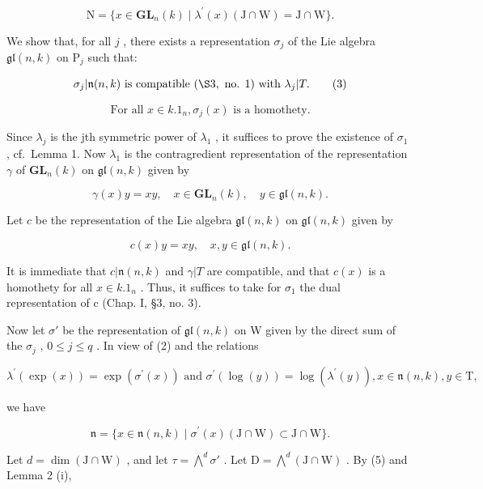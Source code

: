 \[
\mathrm{N} = \{x \in \mathbf {G L} _ {n} (k) \mid \lambda^ {\prime} (x) (\mathrm{J} \cap \mathrm{W}) = \mathrm{J} \cap \mathrm{W} \}.\tag{2}
\]

We show that, for all \(j\) , there exists a representation \(\sigma_{j}\) of the Lie algebra \(\mathfrak{gl}(n,k)\) on \(\mathrm{P}_j\) such that:

\[
\sigma_ {j} | \mathfrak {n} (n, k) \text {   is   compatible   } (\S 3, \text {   no.   } 1) \text {   with   } \lambda_ {j} | T.\tag{3}
\]

\[
\text { For   all } x \in k. 1 _ {n}, \sigma_ {j} (x) \text { is   a   homothety. }\tag{4}
\]

Since \(\lambda_{j}\) is the jth symmetric power of \(\lambda_{1}\) , it suffices to prove the existence of \(\sigma_{1}\) , cf.~Lemma 1. Now \(\lambda_{1}\) is the contragredient representation of the representation \(\gamma\) of \(\mathbf{GL}_{n}(k)\) on \(\mathfrak{gl}(n,k)\) given by

\[
\gamma (x) y = x y, \quad x \in \mathbf {G L} _ {n} (k), \quad y \in \mathfrak {g l} (n, k).
\]

Let \(c\) be the representation of the Lie algebra \(\mathfrak{gl}(n,k)\) on \(\mathfrak{gl}(n,k)\) given by

\[
c (x) y = x y, \quad x, y \in \mathfrak {g l} (n, k).
\]

It is immediate that \(c|\mathfrak{n}(n,k)\) and \(\gamma|T\) are compatible, and that \(c(x)\) is a homothety for all \(x \in k.1_{n}\) . Thus, it suffices to take for \(\sigma_{1}\) the dual representation of c (Chap. I, §3, no. 3).

Now let \(\sigma'\) be the representation of \(\mathfrak{gl}(n,k)\) on W given by the direct sum of the \(\sigma_j\) , \(0 \leq j \leq q\) . In view of (2) and the relations

\[
\lambda^ {\prime} (\exp (x)) = \exp (\sigma^ {\prime} (x)) \text { and } \sigma^ {\prime} (\log (y)) = \log (\lambda^ {\prime} (y)), x \in \mathfrak {n} (n, k), y \in \mathrm{T},
\]

we have

\[
\mathfrak {n} = \{x \in \mathfrak {n} (n, k) \mid \sigma^ {\prime} (x) (\mathrm{J} \cap \mathrm{W}) \subset \mathrm{J} \cap \mathrm{W} \}.\tag{5}
\]

Let \(d = \dim(\mathrm{J} \cap \mathrm{W})\) , and let \(\tau = \bigwedge^{d} \sigma'\) . Let \(\mathrm{D} = \bigwedge^{d} (\mathrm{J} \cap \mathrm{W})\) . By (5) and Lemma 2 (i),


